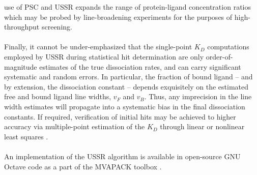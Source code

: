 \begin{doublespace}
use of PSC and USSR expands the range of protein-ligand concentration ratios
which may be probed by \hnmr{} line-broadening experiments for the purposes
of high-throughput screening.
\\\\
Finally, it cannot be under-emphasized that the single-point $K_D$ computations
employed by USSR during statistical hit determination are only
order-of-magnitude estimates of the true dissociation rates, and can carry
significant systematic and random errors. In particular, the fraction of bound
ligand -- and by extension, the dissociation constant -- depends exquisitely
on the estimated free and bound ligand line widths, $v_F$ and $v_B$. Thus, any
imprecision in the line width estimates will propagate into a systematic bias
in the final dissociation constants. If required, verification of initial hits
may be achieved to higher accuracy via multiple-point estimation of the $K_D$
through linear or nonlinear least squares \cite{shortridge:jcomb2008}.
\\\\
An implementation of the USSR algorithm is available in open-source GNU Octave
code as a part of the MVAPACK toolbox \cite{worley:acscb2014}.
\end{doublespace}


